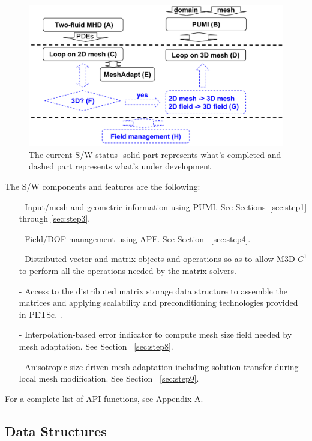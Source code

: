 \documentclass[11pt]{article}  %
\begin{document}
\begin{figure}[hbt]
\center
\includegraphics[width=5in]{fig/M3DC1LoopNewSim.png}
\caption{\small{The current S/W status- solid part represents what's completed and dashed part represents what's under development}} 
\label{fig:M3DC1LoopNew}
\end{figure}

The S/W components and features are the following:
\begin{itemize}
\item[-] Input/mesh and geometric information using PUMI. See Sections~\ref{sec:step1} through \ref{sec:step3}.
\item[-] Field/DOF management using APF. See Section ~\ref{sec:step4}.
\item[-] Distributed vector and matrix objects and operations so as to allow M3D-$C^1$ to perform all the operations needed by the matrix solvers. 
\item[-] Access to the distributed matrix storage data structure to assemble the matrices and applying scalability and preconditioning technologies provided in PETSc. .
\item[-] Interpolation-based error indicator to compute mesh size field needed by mesh adaptation. See Section ~\ref{sec:step8}.
\item[-] Anisotropic size-driven mesh adaptation including solution transfer during local mesh modification. See Section ~\ref{sec:step9}.
\end{itemize}

For a complete list of API functions, see Appendix A.

\subsection{Data Structures}
\end{document}

